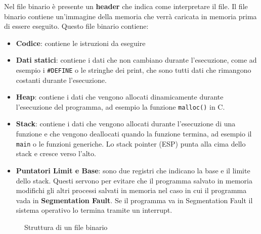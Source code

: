 \documentclass[a4paper]{article}
\theoremstyle{break}
\theoremstyle{break}
\theoremstyle{break}
\theoremstyle{break}
\begin{document}
\vspace{1em}
\noindent Nel file binario è presente un \textbf{header} che indica come interpretare il file.
Il file binario contiene un'immagine della memoria che verrà caricata in memoria
prima di essere eseguito. Questo file binario contiene:
\begin{itemize}
	\item \textbf{Codice}: contiene le istruzioni da eseguire
	\item \textbf{Dati statici}: contiene i dati che non cambiano durante l'esecuzione,
	      come ad esempio i \texttt{\#DEFINE} o le stringhe dei print, che sono tutti dati
	      che rimangono costanti durante l'esecuzione.
	\item \textbf{Heap}: contiene i dati che vengono allocati dinamicamente durante
	      l'esecuzione del programma, ad esempio la funzione \texttt{malloc()} in C.
	\item \textbf{Stack}: contiene i dati che vengono allocati durante l'esecuzione
	      di una funzione e che vengono deallocati quando la funzione termina, ad
	      esempio il \texttt{main} o le funzioni generiche. Lo stack pointer (ESP)
	      punta alla cima dello stack e cresce verso l'alto.
	\item \textbf{Puntatori Limit e Base}: sono due registri che indicano la base
	      e il limite dello stack. Questi servono per evitare che il programma salvato in
	      memoria modifichi gli altri processi salvati in memoria nel caso in cui il
	      programma vada in \textbf{Segmentation Fault}. Se il programma va in Segmentation
	      Fault il sistema operativo lo termina tramite un interrupt.
\end{itemize}

\begin{figure}[H]
	\centering
	\caption{Struttura di un file binario}
\end{figure}
\end{document}
